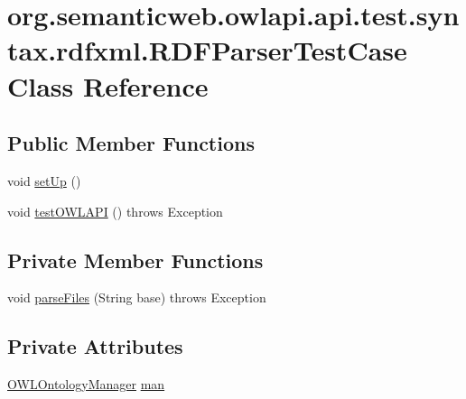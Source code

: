 \hypertarget{classorg_1_1semanticweb_1_1owlapi_1_1api_1_1test_1_1syntax_1_1rdfxml_1_1_r_d_f_parser_test_case}{\section{org.\-semanticweb.\-owlapi.\-api.\-test.\-syntax.\-rdfxml.\-R\-D\-F\-Parser\-Test\-Case Class Reference}
\label{classorg_1_1semanticweb_1_1owlapi_1_1api_1_1test_1_1syntax_1_1rdfxml_1_1_r_d_f_parser_test_case}
}
\subsection*{Public Member Functions}
\begin{DoxyCompactItemize}
\item 
void \hyperlink{classorg_1_1semanticweb_1_1owlapi_1_1api_1_1test_1_1syntax_1_1rdfxml_1_1_r_d_f_parser_test_case_a73d51177b6c8d606f72fce580ad413ad}{set\-Up} ()
\item 
void \hyperlink{classorg_1_1semanticweb_1_1owlapi_1_1api_1_1test_1_1syntax_1_1rdfxml_1_1_r_d_f_parser_test_case_ad247e895489a37fb75ec56b552cbd42f}{test\-O\-W\-L\-A\-P\-I} ()  throws Exception 
\end{DoxyCompactItemize}
\subsection*{Private Member Functions}
\begin{DoxyCompactItemize}
\item 
void \hyperlink{classorg_1_1semanticweb_1_1owlapi_1_1api_1_1test_1_1syntax_1_1rdfxml_1_1_r_d_f_parser_test_case_a81efabfb6282f86032ba7e899a523a3a}{parse\-Files} (String base)  throws Exception 
\end{DoxyCompactItemize}
\subsection*{Private Attributes}
\begin{DoxyCompactItemize}
\item 
\hyperlink{interfaceorg_1_1semanticweb_1_1owlapi_1_1model_1_1_o_w_l_ontology_manager}{O\-W\-L\-Ontology\-Manager} \hyperlink{classorg_1_1semanticweb_1_1owlapi_1_1api_1_1test_1_1syntax_1_1rdfxml_1_1_r_d_f_parser_test_case_a1f61ff16d9ab895fa7eb2d3182168101}{man}
\end{DoxyCompactItemize}


